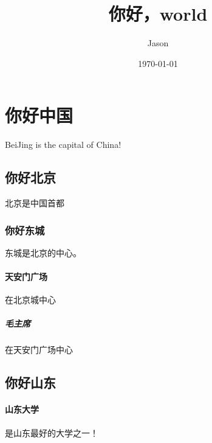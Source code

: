 \documentclass[UTF8]{ctexart}
\title{你好，world}
\author{Jason}
\date{\today}
\begin{document}
\maketitle
\tableofcontents

\section{你好中国}
BeiJing is the capital of China!

\subsection{你好北京}
北京是中国首都
\subsubsection{你好东城}
东城是北京的中心。
\paragraph{天安门广场}
在北京城中心
\subparagraph{毛主席}
在天安门广场中心

\subsection{你好山东}
\paragraph{山东大学} 是山东最好的大学之一！
\end{document}
